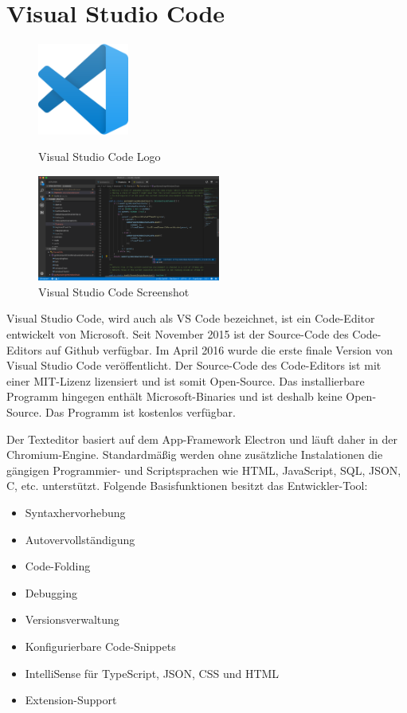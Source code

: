 \section{Visual Studio Code}
\begin{figure}[htb]
    \begin{center}
        \includegraphics[width=3cm] {./pics/Visual_Studio_Code_1.35_icon.svg.png}
        \caption{Visual Studio Code Logo \cite{VsCodeLogo}}
        \includegraphics[width=6cm]{./pics/VS_Code_1.36.0-insider.png}
        \caption{Visual Studio Code Screenshot \cite{VSCodeScreenshotPic}}
    \end{center}
\end{figure}

\cite{VsCodeDoc}
\cite{VsCodeWiki}
\cite{VsCodeWU}

Visual Studio Code, wird auch als VS Code bezeichnet, ist ein Code-Editor entwickelt von Microsoft. 
Seit November 2015 ist der Source-Code des Code-Editors auf Github verfügbar. Im April 2016 wurde die erste finale Version 
von Visual Studio Code veröffentlicht. Der Source-Code des Code-Editors ist mit einer MIT-Lizenz lizensiert und ist somit Open-Source.
Das installierbare Programm hingegen enthält Microsoft-Binaries und ist deshalb keine Open-Source. Das Programm ist kostenlos verfügbar.

Der Texteditor basiert auf dem App-Framework Electron und läuft daher in der Chromium-Engine. Standardmäßig werden ohne zusätzliche Instalationen
die gängigen Programmier- und Scriptsprachen wie HTML, JavaScript, SQL, JSON, C, etc. unterstützt. 
Folgende Basisfunktionen besitzt das Entwickler-Tool:

\begin{itemize}
    \item Syntaxhervorhebung
    \item Autovervollständigung
    \item Code-Folding %
    \item Debugging
    \item Versionsverwaltung
    \item Konfigurierbare Code-Snippets
    \item IntelliSense für TypeScript, JSON, CSS und HTML
    \item Extension-Support
\end{itemize}

